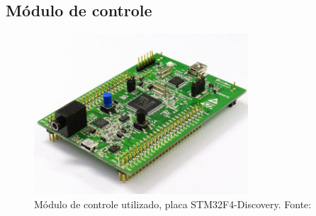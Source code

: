 \documentclass[letterpaper, 10 pt, conference]{ieeeconf}  %
\begin{document}
\subsection{Módulo de controle}

\begin{figure}[thpb]	
	\centering
	\includegraphics[width=8cm]{img/modulocontrole}
	\caption{Módulo de controle utilizado, placa STM32F4-Discovery. Fonte: \cite{omni}}
	\label{img:modulocontrole}
\end{figure}
\end{document}
